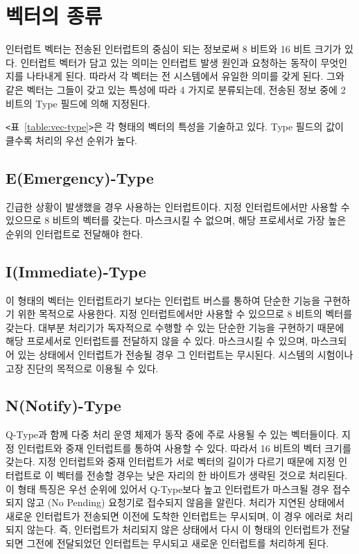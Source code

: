 \section{벡터의 종류}\label{section:vector-type}
인터럽트 벡터는 전송된 인터럽트의 중심이 되는 정보로써 8 비트와 16 비트 크기가 있다.
인터럽트 벡터가 담고 있는 의미는 인터럽트 발생 원인과 요청하는 동작이 무엇인지를
나타내게 된다. 따라서 각 벡터는 전 시스템에서 유일한 의미를 갖게 된다.
그와 같은 벡터는 그들이 갖고 있는 특성에 따라
4 가지로 분류되는데, 전송된 정보 중에 2 비트의 Type 필드에 의해 지정된다.

{\tt <}표~\ref{table:vec-type}{\tt >}은 각 형태의 벡터의 특성을 기술하고 있다.
Type 필드의 값이 클수록 처리의 우선 순위가 높다.
%
\subsection{E(Emergency)-Type}
긴급한 상황이 발생했을 경우 사용하는 인터럽트이다.
지정 인터럽트에서만 사용할 수 있으므로 8 비트의 벡터를 갖는다.
마스크시킬 수 없으며, 해당 프로세서로 가장 높은 순위의 인터럽트로 전달해야 한다.
%
\subsection{I(Immediate)-Type}
이 형태의 벡터는 인터럽트라기 보다는 인터럽트 버스를 통하여 
단순한 기능을 구현하기 위한 목적으로 사용한다.
지정 인터럽트에서만 사용할 수 있으므로 8 비트의 벡터를 갖는다.
대부분 처리기가 독자적으로 수행할 수 있는 단순한 기능을 구현하기 때문에 
해당 프로세서로 인터럽트를 전달하지 않을 수 있다.
마스크시킬 수 있으며, 마스크되어 있는 상태에서 인터럽트가 전송될 경우 그 인터럽트는 무시된다.
시스템의 시험이나 고장 진단의 목적으로 이용될 수 있다.
%
\subsection{N(Notify)-Type}\label{section:n-type}
Q-Type과 함께 다중 처리 운영 체제가 동작 중에 주로 사용될 수 있는 벡터들이다.
지정 인터럽트와 중재 인터럽트를 통하여 사용할 수 있다.  따라서 16 비트의 벡터 크기를 갖는다.
지정 인터럽트와 중재 인터럽트가 서로 벡터의 길이가 다르기 때문에
지정 인터럽트로 이 벡터를 전송할 경우는 낮은 자리의 한 바이트가 생략된 것으로 처리된다.
이 형태 특징은 우선 순위에 있어서 Q-Type보다 높고
인터럽트가 마스크될 경우 접수되지 않고 (No Pending) 요청기로 접수되지 않음을 알린다.
처리가 지연된 상태에서 새로운 인터럽트가 전송되면 이전에 도착한 인터럽트는 무시되며,  
이 경우 에러로 처리되지 않는다.
즉, 인터럽트가 처리되지 않은 상태에서 다시 이 형태의 인터럽트가 
전달되면 그전에 전달되었던 인터럽트는 무시되고 새로운 인터럽트를
처리하게 된다.
%

